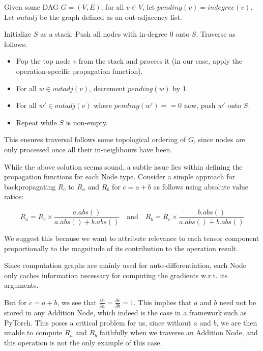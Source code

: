 \documentclass{article}
\begin{document}
\begin{definition}
  \label{def:traversal-heuristic}
  Given some DAG $G = (V, E)$, for all $v \in V$, let $pending(v) = indegree(v)$. Let $outadj$ be the graph defined as an out-adjacency list.
  
  Initialize $S$ as a stack. Push all nodes with in-degree 0 onto $S$. Traverse as follows:
  \begin{itemize}
    \item Pop the top node $v$ from the stack and process it (in our case, apply the operation-specific propagation function).
    \item For all $w \in outadj(v)$, decrement $pending(w)$ by 1.
    \item For all $w' \in outadj(v)$ where $pending(w') == 0$ now, push $w'$ onto $S$.
    \item Repeat while $S$ is non-empty.
  \end{itemize}

  This ensures traversal follows some topological ordering of $G$, since nodes are only processed once all their in-neighbours have been.
\end{definition}

While the above solution seems sound, a subtle issue lies within defining the propagation functions for each Node type.
Consider a simple approach for backpropagating $R_{c}$ to $R_{a}$ and $R_{b}$ for $c = a + b$ as follows using absolute value ratios:

\begin{equation}
  R_{a} = R_{c} \times \frac{a.abs()}{a.abs() + b.abs()} \quad\text{and}\quad R_{b} = R_{c} \times \frac{b.abs()}{a.abs() + b.abs()}
\end{equation}

We suggest this because we want to attribute relevance to each tensor component proportionally to the magnitude of its contribution to the operation result.

Since computation graphs are mainly used for auto-differentiation, each Node only caches information necessary for computing the gradients w.r.t. its arguments.

But for $c = a + b$, we see that $\frac{\partial c}{\partial a} = \frac{\partial c}{\partial b} = 1$. This implies that $a$ and $b$ need not be stored in any Addition Node, which indeed is the case in a framework such as PyTorch.
This poses a critical problem for us, since without $a$ and $b$, we are then unable to compute $R_{a}$ and $R_{b}$ faithfully when we traverse an Addition Node, and this operation is not the only example of this case.
\end{document}
